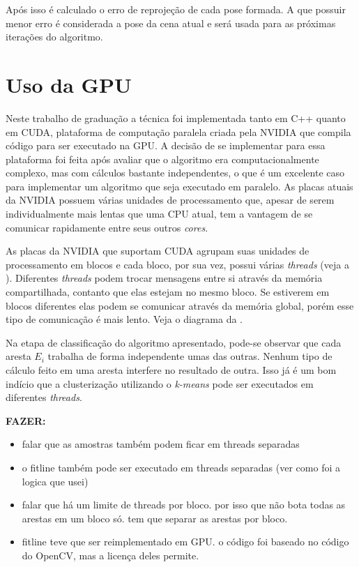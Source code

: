 

Após isso é calculado o erro de reprojeção de cada pose formada. A que possuir menor erro é considerada a pose da cena atual e será usada para as próximas iterações do algoritmo.

\section{Uso da GPU}

Neste trabalho de graduação a técnica foi implementada tanto em C++ quanto em CUDA, plataforma de computação paralela criada pela NVIDIA que compila código para ser executado na GPU. A decisão de se implementar para essa plataforma foi feita após avaliar que o algoritmo era computacionalmente complexo, mas com cálculos bastante independentes, o que é um excelente caso para implementar um algoritmo que seja executado em paralelo. As placas atuais da NVIDIA possuem várias unidades de processamento que, apesar de serem individualmente mais lentas que uma CPU atual, tem a vantagem de se comunicar rapidamente entre seus outros \emph{cores}.

As placas da NVIDIA que suportam CUDA agrupam suas unidades de processamento em blocos e cada bloco, por sua vez, possui várias \emph{threads} (veja a ). Diferentes \emph{threads} podem trocar mensagens entre si através da memória compartilhada, contanto que elas estejam no mesmo bloco. Se estiverem em blocos diferentes elas podem se comunicar através da memória global, porém esse tipo de comunicação é mais lento. Veja o diagrama da .

Na etapa de classificação do algoritmo apresentado, pode-se observar que cada aresta $E_i$ trabalha de forma independente umas das outras. Nenhum tipo de cálculo feito em uma aresta interfere no resultado de outra. Isso já é um bom indício que a clusterização utilizando o \emph{k-means} pode ser executados em diferentes \emph{threads}.

\textbf{FAZER:}
\begin{itemize}
	\item falar que as amostras também podem ficar em threads separadas
	\item o fitline também pode ser executado em threads separadas (ver como foi a logica que usei)
	\item falar que há um limite de threads por bloco. por isso que não bota todas as arestas em um bloco só. tem que separar as arestas por bloco.
	\item fitline teve que ser reimplementado em GPU. o código foi baseado no código do OpenCV, mas a licença deles permite.
\end{itemize}

